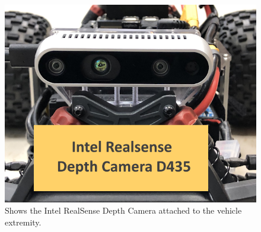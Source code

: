 \documentclass[conference]{IEEEtran}
\begin{document}
\begin{figure}
    \centering
    \includegraphics[scale=0.25]{realsense_diagram.png}
    \caption{Shows the Intel RealSense Depth Camera attached to the vehicle extremity.}
    \label{Figure 4}
\end{figure}






\end{document}
